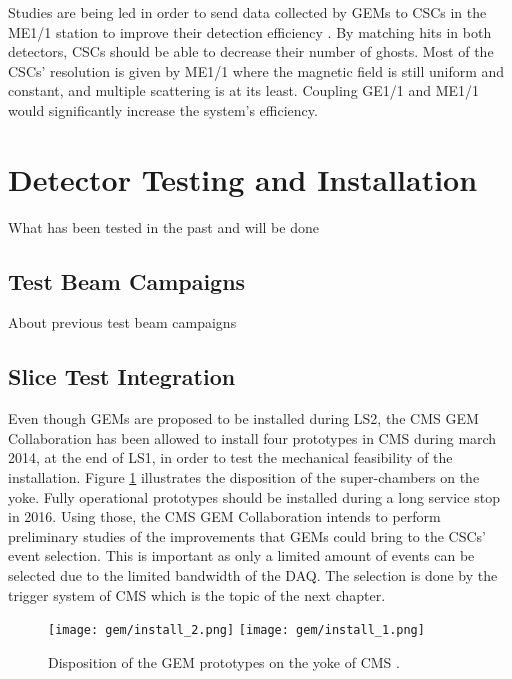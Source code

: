         Studies are being led in order to send data collected by GEMs to CSCs in the ME1/1 station to improve their detection efficiency \Cite{GEM_CSC_Trigger}. By matching hits in both detectors, CSCs should be able to decrease their number of ghosts. Most of the CSCs' resolution is given by ME1/1 where the magnetic field is still uniform and constant, and multiple scattering is at its least. Coupling GE1/1 and ME1/1 would significantly increase the system's efficiency.

    \section{Detector Testing and Installation}

        What has been tested in the past and will be done

        \subsection{Test Beam Campaigns}

            About previous test beam campaigns

        \subsection{Slice Test Integration}

            Even though GEMs are proposed to be installed during LS2, the CMS GEM Collaboration has been allowed to install four prototypes in CMS during march 2014, at the end of LS1, in order to test the mechanical feasibility of the installation. Figure \ref{fig:gas_electron_multiplier_detectors__install} illustrates the disposition of the super-chambers on the yoke. Fully operational prototypes should be installed during a long service stop in 2016. Using those, the CMS GEM Collaboration intends to perform preliminary studies of the improvements that GEMs could bring to the CSCs' event selection. This is important as only a limited amount of events can be selected due to the limited bandwidth of the DAQ. The selection is done by the trigger system of CMS which is the topic of the next chapter.

            \begin{figure}[h!]
                \centering
                \texttt{[image: gem/install\_2.png]}
                \texttt{[image: gem/install\_1.png]}
                \caption{Disposition of the GEM prototypes on the yoke of CMS \Cite{GEM_Technical_Proposal}.}
                \label{fig:gas_electron_multiplier_detectors__install}
            \end{figure}    

